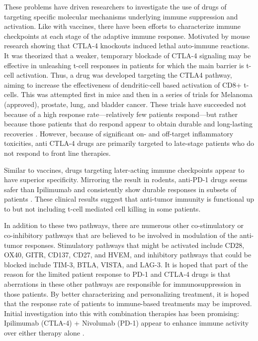These problems have driven researchers to investigate the use of drugs of targeting specific molecular mechanisms underlying immune suppression and activation. 
Like with vaccines, there have been efforts to characterize immune checkpoints at each stage of the adaptive immune response. 
Motivated by mouse research showing that CTLA-4 knockouts induced lethal auto-immune reactions.
It was theorized that a weaker, temporary blockade of CTLA-4 signaling may be effective in unleashing t-cell responses in patients for which the main barrier is t-cell activation. 
Thus, a drug was developed targeting the CTLA4 pathway, aiming to increase the effectiveness of dendritic-cell based activation of CD8+ t-cells. 
This was attempted first in mice and then in a series of trials for Melanoma (approved), prostate, lung, and bladder cancer. %
These trials have succeeded not because of a high response rate---relatively few patients respond---but rather because those patients that do respond appear to obtain durable and long-lasting recoveries \citep{Robert2011,Hodi2010}.
However, because of significant on- and off-target inflammatory toxicities, anti CTLA-4 drugs are primarily targeted to late-stage patients who do not respond to front line therapies. 

Similar to vaccines, drugs targeting later-acting immune checkpoints appear to have superior specificity. 
Mirroring the result in rodents, anti-PD-1 drugs seems safer than Ipilimumab \citep{Brahmer2010} and consistently show durable responses in subsets of patients \citep{Hamid2013,McDermott2014}. 
These clinical results suggest that anti-tumor immunity is functional up to but not including t-cell mediated cell killing in some patients. 

In addition to these two pathways, there are numerous other co-stimulatory or co-inhibitory pathways that are believed to be involved in modulation of the anti-tumor responses. 
Stimulatory pathways that might be activated include CD28, OX40, GITR, CD137, CD27, and HVEM, and inhibitory pathways that could be blocked include TIM-3, BTLA, VISTA, and LAG-3. 
It is hoped that part of the reason for the limited patient response to PD-1 and CTLA-4 drugs is that aberrations in these other pathways are responsible for immunosuppression in those patients. 
By better characterizing and personalizing treatment, it is hoped that the response rate of patients to immune-based treatments may be improved. 
Initial investigation into this with combination therapies has been promising: Ipilimumab (CTLA-4) + Nivolumab (PD-1) appear to enhance immune activity over either therapy alone \citep{Wolchok2013}.


